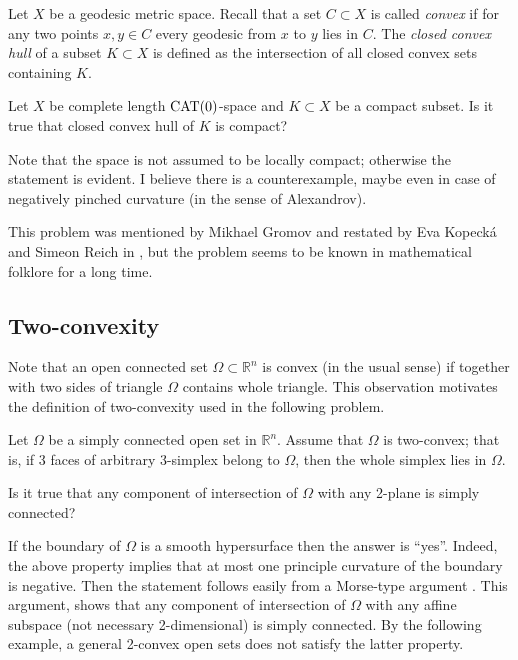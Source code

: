 Let $X$ be a geodesic metric space.
Recall that a set $C\subset X$ is called \emph{convex} if for any two points $x,y\in C$ every geodesic from $x$ to $y$ lies in $C$. 
The \emph{closed convex hull} of a subset $K\subset X$ is defined as the intersection of all closed convex sets containing $K$.


\begin{pr}
Let $X$ be complete length $\mathop{\rm CAT}(0)$-space and $K\subset X$ be a compact subset.
Is it true that closed  convex hull of $K$ is compact?
\end{pr}


Note that the space is not assumed to be locally compact; otherwise the statement is evident.
I believe there is a counterexample, maybe even in case of negatively pinched curvature (in the sense of Alexandrov).

This problem was mentioned by Mikhael Gromov \cite[6.B$_1\text{(f)}$]{gromov-asymptotic}
and restated by Eva Kopeck\'a and Simeon Reich in \cite[see][]{kopecka-reich}, 
but the problem seems to be known in mathematical folklore for a long time. 



\subsection*{Two-convexity}
\label{Two-convexity}

Note that an open connected set $\Omega\subset\mathbb R^n$ is convex (in the usual sense) if together with two sides of triangle $\Omega$ contains whole triangle.
This observation motivates the definition of two-convexity used in the following problem.


\begin{pr}
Let $\Omega$ be a simply connected open set in $\mathbb R^n$.
Assume that $\Omega$ is two-convex; that is, if 3 faces of arbitrary 3-simplex belong to $\Omega$, then the whole simplex lies in $\Omega$.

Is it true that any component of intersection of $\Omega$ with any 2-plane is simply connected?
\end{pr}


If the boundary of $\Omega$ is a smooth hypersurface then the answer is ``yes''.
Indeed, the above property implies that at most one principle curvature of the boundary is negative.
Then the statement follows easily from a Morse-type argument \cite[see Lefschetz theorem in Section~$\tfrac12$ in][]{gromov-SGMC}.
This argument, shows that any component of intersection of $\Omega$ with any affine subspace (not necessary 2-dimensional) is simply connected.
By the following example, a general 2-convex open sets does not satisfy the latter property.

